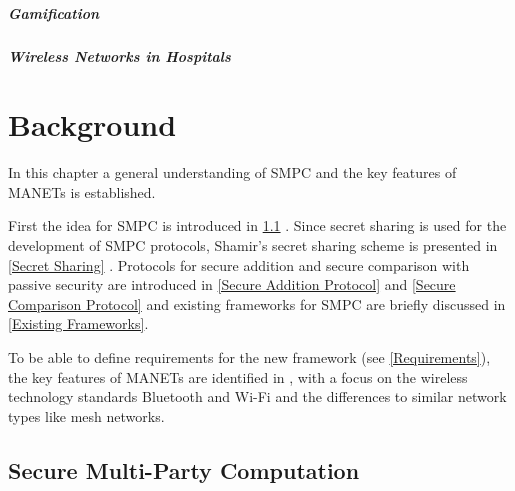 \paragraph{Gamification}

\paragraph{Wireless Networks in Hospitals}

\FloatBarrier



\chapter{Background} \label{Background}



In this chapter a general understanding of \gls{SMPC} and the key features of \glspl{MANET} is established.  

First the idea for \gls{SMPC} is introduced in \ref{Secure Multi-Party Computation} . Since secret sharing is used for the development of \gls{SMPC} protocols, Shamir's secret sharing scheme is presented in \ref{Secret Sharing} .
Protocols for secure addition and secure comparison with passive security are introduced in \ref{Secure Addition Protocol} and \ref{Secure Comparison Protocol} and existing frameworks for \gls{SMPC} are briefly discussed in \ref{Existing Frameworks}.

To be able to define requirements for the new framework (see \ref{Requirements}), the key features of \glspl{MANET} are identified in , with a focus on the wireless technology standards Bluetooth and Wi-Fi and the differences to similar network types like mesh networks.


\section{Secure Multi-Party Computation} \label{Secure Multi-Party Computation}

